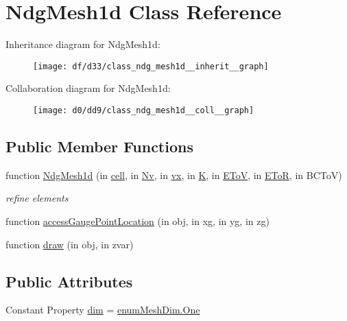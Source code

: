 \hypertarget{class_ndg_mesh1d}{}\section{Ndg\+Mesh1d Class Reference}
\label{class_ndg_mesh1d}


Inheritance diagram for Ndg\+Mesh1d\+:
\nopagebreak
\begin{figure}[H]
\begin{center}
\leavevmode
\texttt{[image: df/d33/class\_ndg\_mesh1d\_\_inherit\_\_graph]}
\end{center}
\end{figure}


Collaboration diagram for Ndg\+Mesh1d\+:
\nopagebreak
\begin{figure}[H]
\begin{center}
\leavevmode
\texttt{[image: d0/dd9/class\_ndg\_mesh1d\_\_coll\_\_graph]}
\end{center}
\end{figure}
\subsection*{Public Member Functions}
\begin{DoxyCompactItemize}
\item 
function \hyperlink{class_ndg_mesh1d_a8ac44af9495afb74ad070bf877e5af6e}{Ndg\+Mesh1d} (in \hyperlink{class_ndg_mesh_a6f128cd638adcec9a184937ad483232a}{cell}, in \hyperlink{class_ndg_mesh_a1d100eb162c56c890e007b8d2ff267a3}{Nv}, in \hyperlink{class_ndg_mesh_a2b7b3abe64802afdb217cce9a2cb3f04}{vx}, in \hyperlink{class_ndg_mesh_a81fc6a6affd3609e69eb1b8fc72b7f2f}{K}, in \hyperlink{class_ndg_mesh_a3ab88286c8e628f39ad7654d8e43fd96}{E\+ToV}, in \hyperlink{class_ndg_mesh_a58a82bb05a658319454739725b098e2a}{E\+ToR}, in B\+C\+ToV)
\begin{DoxyCompactList}\small\item\em refine elements \end{DoxyCompactList}\item 
function \hyperlink{class_ndg_mesh1d_a56999c262d799a7d34a577e0306c2e90}{access\+Gauge\+Point\+Location} (in obj, in xg, in yg, in zg)
\item 
function \hyperlink{class_ndg_mesh1d_ad486c6667cc1097f66a98a3955a51424}{draw} (in obj, in zvar)
\end{DoxyCompactItemize}
\subsection*{Public Attributes}
\begin{DoxyCompactItemize}
\item 
Constant Property \hyperlink{class_ndg_mesh1d_addd292d33f15965cef132a48fb4c74bd}{dim} = \hyperlink{classenum_mesh_dim_a5a67c42a0c79eab8e32b9c613507a672a459e0997a41df310edd45a87176a6f41}{enum\+Mesh\+Dim.\+One}
\end{DoxyCompactItemize}
